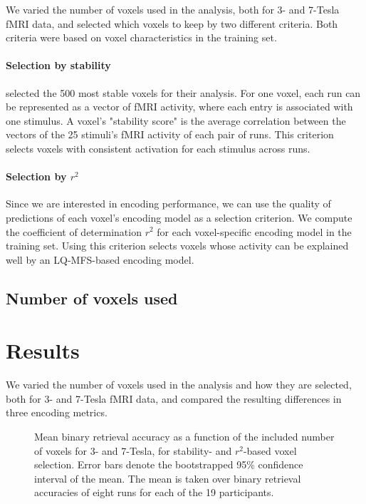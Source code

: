 We varied the number of voxels used in the analysis, both for 3- and 7-Tesla f{MRI} data,
and selected which voxels to keep by two different criteria. Both criteria were
based on voxel characteristics in the training set.  

\paragraph{Selection by stability}

\citet{ML08} selected the 500 most stable voxels for their analysis. For one
voxel, each run can be represented as a vector of f{MRI} activity, where each
entry is associated with one stimulus. A voxel's "stability score" is the average correlation between the vectors of the 25 stimuli's f{MRI} activity of each pair of runs.
This criterion selects voxels with consistent activation for each stimulus across runs.

\paragraph{Selection by $r^2$}

Since we are interested in encoding performance, we can use the quality of
predictions of each voxel's encoding model as a selection criterion. We compute
the coefficient of determination $r^2$ for each voxel-specific encoding model in
the training set. Using this criterion selects voxels whose activity can be explained well
by an LQ-MFS-based encoding model.

\subsection*{Number of voxels used}



\section*{Results}
%
We varied the number of voxels used in the analysis and how they are selected,
both for 3- and 7-Tesla f{MRI} data, and compared the resulting differences in
three encoding metrics.

\begin{figure}
  \centering
  \def\svgwidth{\linewidth}
  
	
  \caption{Mean binary retrieval accuracy as a function of the included number of
  voxels for 3- and 7-Tesla, for stability- and $r^2$-based voxel selection. Error bars denote the bootstrapped 95\% confidence
  interval of the mean. The mean is taken over binary retrieval accuracies of
  eight runs for each of the 19 participants.
  }

 \label{fig:binary_retrieval}
\end{figure}

